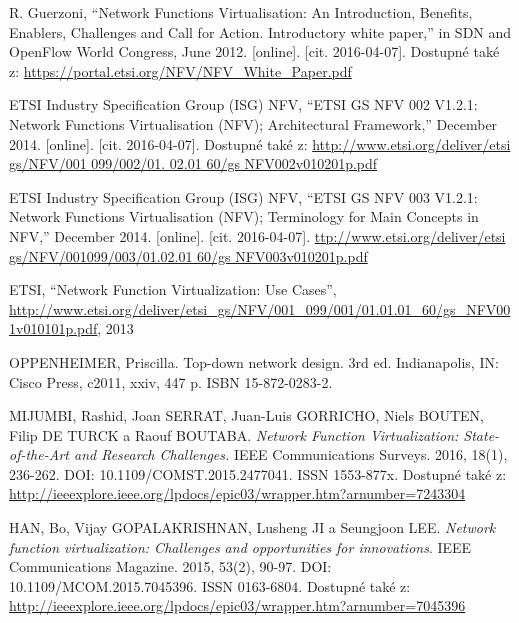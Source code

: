 
 \renewcommand{\appendixname}{Literatura}%

  
\begin{thebibliography}{10}


R. Guerzoni, “Network Functions Virtualisation: An Introduction, Benefits, Enablers, Challenges and Call for Action. Introductory white paper,” in SDN and OpenFlow World Congress, June 2012. [online]. [cit. 2016-04-07]. Dostupné také z: \url{https://portal.etsi.org/NFV/NFV_White_Paper.pdf}


ETSI Industry Specification Group (ISG) NFV, “ETSI GS NFV 002 V1.2.1: Network Functions Virtualisation (NFV); Architectural Framework,” December 2014. [online]. [cit. 2016-04-07]. Dostupné také z: \url{http://www.etsi.org/deliver/etsi gs/NFV/001 099/002/01. 02.01 60/gs NFV002v010201p.pdf} 

ETSI Industry Specification Group (ISG) NFV, “ETSI GS NFV 003 V1.2.1: Network Functions Virtualisation (NFV); Terminology for Main Concepts in NFV,” December 2014. [online]. [cit. 2016-04-07]. \url{ttp://www.etsi.org/deliver/etsi gs/NFV/001099/003/01.02.01 60/gs NFV003v010201p.pdf}

ETSI, “Network Function Virtualization: Use Cases”, \url{http://www.etsi.org/deliver/etsi_gs/NFV/001_099/001/01.01.01_60/gs_NFV001v010101p.pdf}, 2013

OPPENHEIMER, Priscilla. Top-down network design. 3rd ed. Indianapolis, IN: Cisco Press, c2011, xxiv, 447 p. ISBN 15-872-0283-2.

MIJUMBI, Rashid, Joan SERRAT, Juan-Luis GORRICHO, Niels BOUTEN, Filip DE TURCK a Raouf BOUTABA. \emph{Network Function Virtualization: State-of-the-Art and Research Challenges.} IEEE Communications Surveys. 2016, 18(1), 236-262. DOI: 10.1109/COMST.2015.2477041. ISSN 1553-877x. Dostupné také z: \url{http://ieeexplore.ieee.org/lpdocs/epic03/wrapper.htm?arnumber=7243304}

HAN, Bo, Vijay GOPALAKRISHNAN, Lusheng JI a Seungjoon LEE. \emph{Network function virtualization: Challenges and opportunities for innovations}. IEEE Communications Magazine. 2015, 53(2), 90-97. DOI: 10.1109/MCOM.2015.7045396. ISSN 0163-6804. Dostupné také z: \url{http://ieeexplore.ieee.org/lpdocs/epic03/wrapper.htm?arnumber=7045396}


\end{thebibliography}
